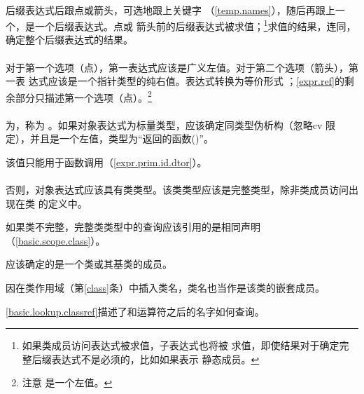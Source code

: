 \paragraph{} %
后缀表达式后跟点或箭头\tm{->}，可选地跟上关键字
（\ref{temp.names}），随后再跟上一个，是一个后缀表达式。点或
箭头前的后缀表达式被求值；\footnote{如果类成员访问表达式被求值，子表达式也将被
求值，即使结果对于确定完整后缀表达式不是必须的，比如如果表示
静态成员。}求值的结果，连同，确定整个后缀表达式的结果。

\paragraph{} %
对于第一个选项（点），第一表达式应该是广义左值。对于第二个选项（箭头），第一表
达式应该是一个指针类型的纯右值。表达式转换为等价形式
；\ref{expr.ref}的剩余部分只描述第一个选项（点）。\footnote{注意
是一个左值。}

\paragraph{} %
为，称为
。如果对象表达式为标量类型，应该确定同类型伪析构（忽略cv
限定），并且是一个左值，类型为“返回的函数()”。

\begin{note}
  该值只能用于函数调用（\ref{expr.prim.id.dtor}）。
\end{note}

\paragraph{} %
否则，对象表达式应该具有类类型。该类类型应该是完整类型，除非类成员访问出现在类
的定义中。

\begin{note}
  如果类不完整，完整类类型中的查询应该引用的是相同声明
  （\ref{basic.scope.class}）。
\end{note}

应该确定的是一个类或其基类的成员。

\begin{note}
  因在类作用域（第\ref{class}条）中插入类名，类名也当作是该类的嵌套成员。
\end{note}

\begin{note}
  \ref{basic.lookup.classref}描述了和\tm{->}运算符之后的名字如何查询。
\end{note}

